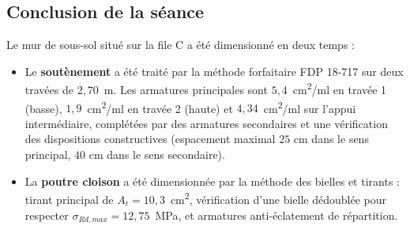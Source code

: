 \subsection{Conclusion de la séance}

Le mur de sous-sol situé sur la file C a été dimensionné en deux temps :

\begin{itemize}
  \item Le \textbf{soutènement} a été traité par la méthode forfaitaire FDP 18-717 sur deux travées de $2{,}70$~m. Les armatures principales sont $5{,}4$~cm\textsuperscript{2}/ml en travée 1 (basse), $1{,}9$~cm\textsuperscript{2}/ml en travée 2 (haute) et $4{,}34$~cm\textsuperscript{2}/ml sur l'appui intermédiaire, complétées par des armatures secondaires et une vérification des dispositions constructives (espacement maximal $25$ cm dans le sens principal, $40$ cm dans le sens secondaire).
  \item La \textbf{poutre cloison} a été dimensionnée par la méthode des bielles et tirants : tirant principal de $A_t = 10{,}3$~cm\textsuperscript{2}, vérification d'une bielle dédoublée pour respecter $\sigma_{Rd,max} = 12{,}75$~MPa, et armatures anti-éclatement de répartition.
\end{itemize}

